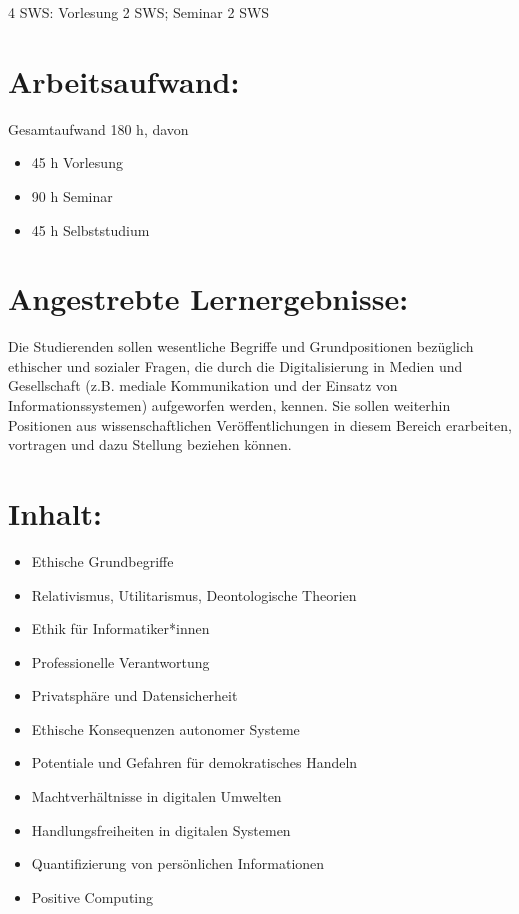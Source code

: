 4 SWS: Vorlesung 2 SWS; Seminar 2 SWS

\section*{Arbeitsaufwand:}\label{arbeitsaufwand}

Gesamtaufwand 180 h, davon

\begin{itemize}
\tightlist
\item
  45 h Vorlesung
\item
  90 h Seminar
\item
  45 h Selbststudium
\end{itemize}

\section*{Angestrebte
Lernergebnisse:}\label{angestrebte-lernergebnisse}

Die Studierenden sollen wesentliche Begriffe und Grundpositionen
bezüglich ethischer und sozialer Fragen, die durch die Digitalisierung
in Medien und Gesellschaft (z.B. mediale Kommunikation und der Einsatz
von Informationssystemen) aufgeworfen werden, kennen. Sie sollen
weiterhin Positionen aus wissenschaftlichen Veröffentlichungen in diesem
Bereich erarbeiten, vortragen und dazu Stellung beziehen können.

\section*{Inhalt:}\label{inhalt}

\begin{itemize}
\tightlist
\item
  Ethische Grundbegriffe
\item
  Relativismus, Utilitarismus, Deontologische Theorien
\item
  Ethik für Informatiker*innen
\item
  Professionelle Verantwortung
\item
  Privatsphäre und Datensicherheit
\item
  Ethische Konsequenzen autonomer Systeme
\item
  Potentiale und Gefahren für demokratisches Handeln
\item
  Machtverhältnisse in digitalen Umwelten
\item
  Handlungsfreiheiten in digitalen Systemen
\item
  Quantifizierung von persönlichen Informationen
\item
  Positive Computing
\end{itemize}

